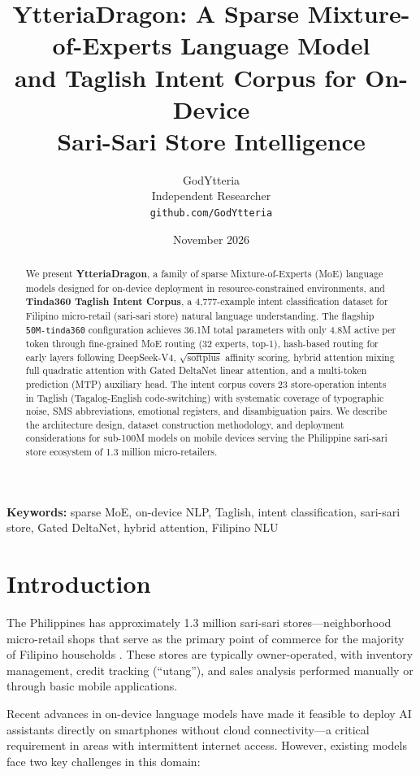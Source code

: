 \documentclass[11pt,a4paper]{article}
\title{%
  \textbf{YtteriaDragon: A Sparse Mixture-of-Experts Language Model\\
  and Taglish Intent Corpus for On-Device\\
  Sari-Sari Store Intelligence}%
}
\author{
  GodYtteria\\
  Independent Researcher\\
  \texttt{github.com/GodYtteria}
}
\date{November 2026}
\begin{document}
\maketitle

\begin{abstract}
We present \textbf{YtteriaDragon}, a family of sparse Mixture-of-Experts (MoE)
language models designed for on-device deployment in resource-constrained
environments, and \textbf{Tinda360 Taglish Intent Corpus}, a 4{,}777-example
intent classification dataset for Filipino micro-retail (sari-sari store)
natural language understanding. The flagship \texttt{50M-tinda360} configuration
achieves 36.1M total parameters with only 4.8M active per token through
fine-grained MoE routing (32 experts, top-1), hash-based routing for early
layers following DeepSeek-V4, $\sqrt{\mathrm{softplus}}$ affinity scoring,
hybrid attention mixing full quadratic attention with Gated DeltaNet linear
attention, and a multi-token prediction (MTP) auxiliary head. The intent corpus
covers 23 store-operation intents in Taglish (Tagalog-English code-switching)
with systematic coverage of typographic noise, SMS abbreviations, emotional
registers, and disambiguation pairs. We describe the architecture design,
dataset construction methodology, and deployment considerations for
sub-100M models on mobile devices serving the Philippine sari-sari store
ecosystem of 1.3 million micro-retailers.
\end{abstract}

\textbf{Keywords:} sparse MoE, on-device NLP, Taglish, intent classification,
sari-sari store, Gated DeltaNet, hybrid attention, Filipino NLU

\section{Introduction}
\label{sec:intro}

The Philippines has approximately 1.3 million sari-sari stores---neighborhood
micro-retail shops that serve as the primary point of commerce for the majority
of Filipino households \citep{dti2023sari}. These stores are typically
owner-operated, with inventory management, credit tracking (``utang''), and
sales analysis performed manually or through basic mobile applications.

Recent advances in on-device language models have made it feasible to deploy
AI assistants directly on smartphones without cloud connectivity---a critical
requirement in areas with intermittent internet access. However, existing
models face two key challenges in this domain:
\end{document}
